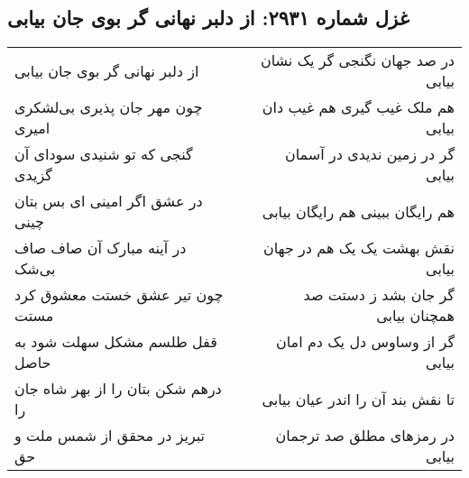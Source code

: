 \begin{center}
\section*{غزل شماره ۲۹۳۱: از دلبر نهانی گر بوی جان بیابی}
\label{sec:2931}
\begin{longtable}{l p{0.5cm} r}
از دلبر نهانی گر بوی جان بیابی
&&
در صد جهان نگنجی گر یک نشان بیابی
\\
چون مهر جان پذیری بی‌لشکری امیری
&&
هم ملک غیب گیری هم غیب دان بیابی
\\
گنجی که تو شنیدی سودای آن گزیدی
&&
گر در زمین ندیدی در آسمان بیابی
\\
در عشق اگر امینی ای بس بتان چینی
&&
هم رایگان ببینی هم رایگان بیابی
\\
در آینه مبارک آن صاف صاف بی‌شک
&&
نقش بهشت یک یک هم در جهان بیابی
\\
چون تیر عشق خستت معشوق کرد مستت
&&
گر جان بشد ز دستت صد همچنان بیابی
\\
قفل طلسم مشکل سهلت شود به حاصل
&&
گر از وساوس دل یک دم امان بیابی
\\
درهم شکن بتان را از بهر شاه جان را
&&
تا نقش بند آن را اندر عیان بیابی
\\
تبریز در محقق از شمس ملت و حق
&&
در رمزهای مطلق صد ترجمان بیابی
\\
\end{longtable}
\end{center}
